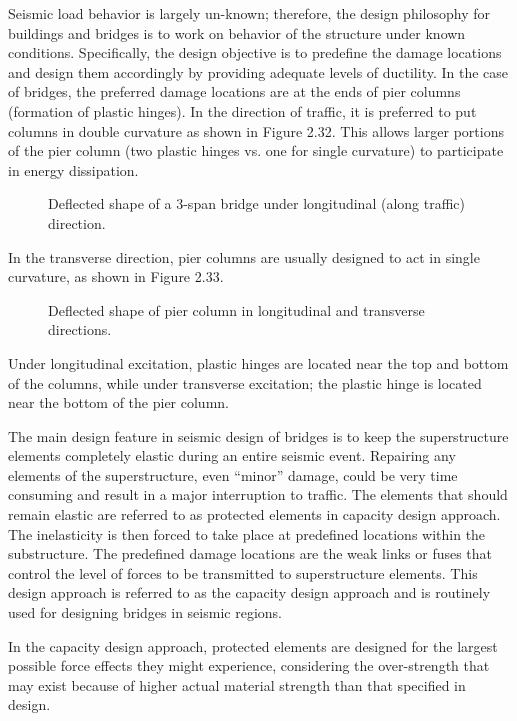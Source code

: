 Seismic load behavior is largely un-known; therefore, the design philosophy for buildings and bridges is to work
on behavior of the structure under known conditions. Specifically, the design objective is to predefine the damage
locations and design them accordingly by providing adequate levels of ductility. In the case of bridges, the preferred
damage locations are at the ends of pier columns (formation of plastic hinges). In the direction of traffic, it is
preferred to put columns in double curvature as shown in Figure 2.32. This allows larger portions of the pier column
(two plastic hinges vs. one for single curvature) to participate in energy dissipation.

\begin{figure}
  \caption{Deflected shape of a 3-span bridge under longitudinal (along traffic) direction.}\label{fig:deflected-shape-longtitudianl}
\end{figure}

In the transverse direction, pier columns are usually designed to act in single curvature, as shown in Figure 2.33.

\begin{figure}
  \caption{Deflected shape of pier column in longitudinal and transverse directions.}\label{fig:deflected-shape-longtitudianl-transverse}
\end{figure}

Under longitudinal excitation, plastic hinges are located near the top and bottom of the columns, while under
transverse excitation; the plastic hinge is located near the bottom of the pier column.

The main design feature in seismic design of bridges is to keep the superstructure elements completely elastic
during an entire seismic event. Repairing any elements of the superstructure, even “minor” damage, could be very
time consuming and result in a major interruption to traffic. The elements that should remain elastic are referred to as
protected elements in capacity design approach. The inelasticity is then forced to take place at predefined locations
within the substructure. The predefined damage locations are the weak links or fuses that control the level of forces
to be transmitted to superstructure elements. This design approach is referred to as the capacity design approach and
is routinely used for designing bridges in seismic regions.

In the capacity design approach, protected elements are designed for the largest possible force effects they might
experience, considering the over-strength that may exist because of higher actual material strength than that specified
in design.

